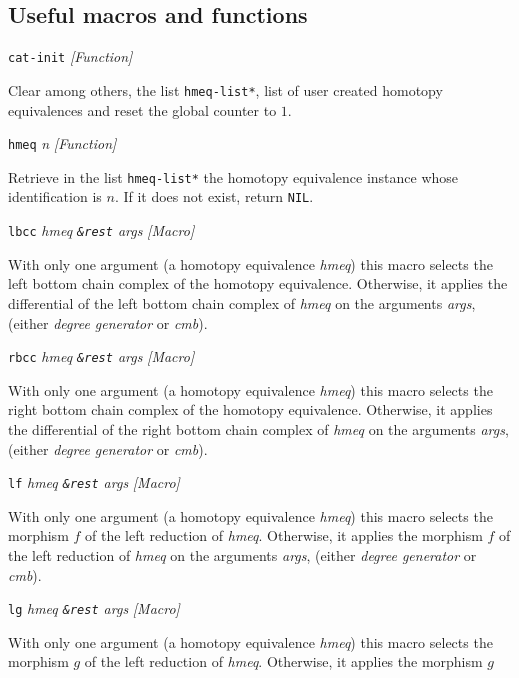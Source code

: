 \subsection {Useful macros and functions}

{\parindent=0mm
{\leftskip=5mm
{\tt cat-init} \hfill {\em [Function]} \par}
{\leftskip=15mm
Clear among others, the list {\tt *hmeq-list*}, list of user created homotopy equivalences  and reset
the global counter to $1$. \par}
{\leftskip=5mm
{\tt hmeq} {\em n} \hfill {\em [Function]} \par}
{\leftskip=15mm
Retrieve in the list {\tt *hmeq-list*} the  homotopy equivalence  instance whose identification
is $n$. If it does not exist, return {\tt NIL}. \par}
{\leftskip=5mm
{\tt lbcc} {\em hmeq {\tt \&rest} args} \hfill {\em [Macro]} \par}
{\leftskip=15mm
With only one argument (a homotopy equivalence {\em hmeq}) this macro selects
the left bottom chain complex of the homotopy equivalence. Otherwise, it applies  the differential 
of the left bottom chain complex of  {\em hmeq} on the arguments {\em args},
(either {\em degree generator} or {\em cmb}).  \par}
{\leftskip=5mm
{\tt rbcc} {\em hmeq {\tt \&rest} args} \hfill {\em [Macro]} \par}
{\leftskip=15mm
With only one argument (a homotopy equivalence {\em hmeq}) this macro selects
the right bottom chain complex of the homotopy equivalence. Otherwise, it applies  the differential 
of the right  bottom chain complex of  {\em hmeq} on the arguments {\em args},
(either {\em degree generator} or {\em cmb}).  \par}
{\leftskip=5mm
{\tt lf} {\em hmeq {\tt \&rest} args} \hfill {\em [Macro]} \par}
{\leftskip=15mm
With only one argument (a homotopy equivalence {\em hmeq}) this macro selects
the morphism $f$ of the left reduction of {\em hmeq}. Otherwise, it applies  the morphism $f$
of the left reduction of {\em hmeq} on the arguments {\em args},
(either {\em degree generator} or {\em cmb}).  \par}
{\leftskip=5mm
{\tt lg} {\em hmeq {\tt \&rest} args} \hfill {\em [Macro]} \par}
{\leftskip=15mm
With only one argument (a homotopy equivalence {\em hmeq}) this macro selects
the morphism $g$ of the left reduction of {\em hmeq}. Otherwise, it applies  the morphism $g$
}}
